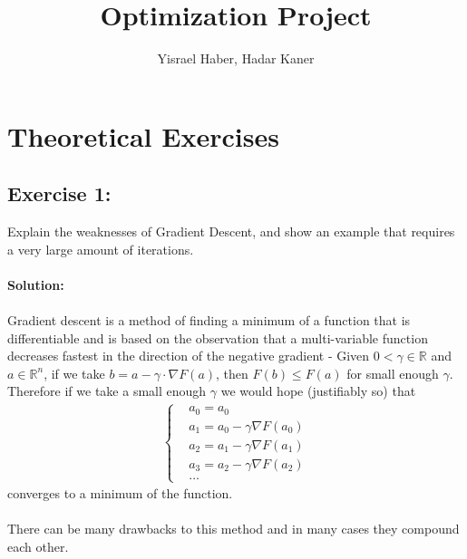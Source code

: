 \documentclass{article}
\title{Optimization Project}
\author{Yisrael Haber, Hadar Kaner}
\begin{document}
\maketitle
\tableofcontents
\newpage
\section{Theoretical Exercises}
\subsection{Exercise 1:}
Explain the weaknesses of Gradient Descent, and show an example that requires a very large amount of iterations. \\ \\
\textbf{Solution:} \\ \\
Gradient descent is a method of finding a minimum of a function that is differentiable and is based on the observation that a multi-variable function decreases fastest in the direction of the negative gradient -  Given $0<\gamma\in \mathbb{R}$ and $a\in \mathbb{R}^n$, if we take $b = a - \gamma\cdot\nabla F(a)$, then $F(b)\leq F(a)$ for small enough $\gamma$. Therefore if we take a small enough $\gamma$ we would hope (justifiably so) that 
\begin{align*}
    \begin{cases}
    &a_0 = a_0 \\
    &a_1 = a_0 - \gamma\nabla F(a_0) \\
    &a_2 = a_1 - \gamma\nabla F(a_1) \\
    &a_3 = a_2 - \gamma\nabla F(a_2) \\
    & \dots
    \end{cases}
\end{align*}
converges to a minimum of the function. \\ \\
There can be many drawbacks to this method and in many cases they compound each other. 
\end{document}
